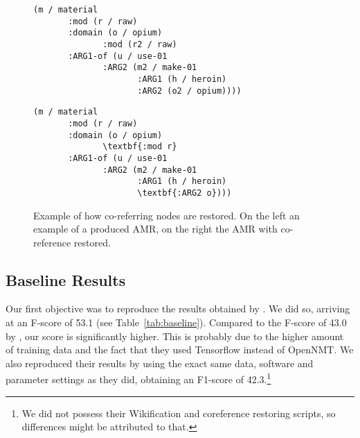 \documentclass[a4paper,10pt,twoside]{article}
\begin{document}
\begin{figure*}[!htb]
{
  \begin{minipage}{.5\textwidth}\centering
  \begin{Verbatim}[commandchars=\\\{\}]
(m / material
       :mod (r / raw)
       :domain (o / opium)
              :mod (r2 / raw)
       :ARG1-of (u / use-01
              :ARG2 (m2 / make-01
                     :ARG1 (h / heroin)
                     :ARG2 (o2 / opium))))
\end{Verbatim}
  \end{minipage}
  \begin{minipage}{0.5\textwidth}
  \begin{Verbatim}[commandchars=\\\{\}]
(m / material
       :mod (r / raw)
       :domain (o / opium)
              \textbf{:mod r}
       :ARG1-of (u / use-01
              :ARG2 (m2 / make-01
                     :ARG1 (h / heroin)
                     \textbf{:ARG2 o})))
\end{Verbatim}
  \end{minipage}
  \caption{\label{fig:coref}Example of how co-referring nodes are restored. On the left an example of a produced AMR, on the right the AMR with co-reference restored.}
}
\end{figure*}

\subsection{Baseline Results}

Our first objective was to reproduce the results obtained by . We did so, arriving at an F-score of 53.1 (see Table~\ref{tab:baseline}). Compared to the F-score of 43.0 by , our score is significantly higher. This is probably due to the higher amount of training data and the fact that they used Tensorflow instead of OpenNMT. We also reproduced their results by using the exact same data, software and parameter settings as they did, obtaining an F1-score of 42.3.\footnote{We did not possess their Wikification and coreference restoring scripts, so differences might be attributed to that.}
\end{document}
